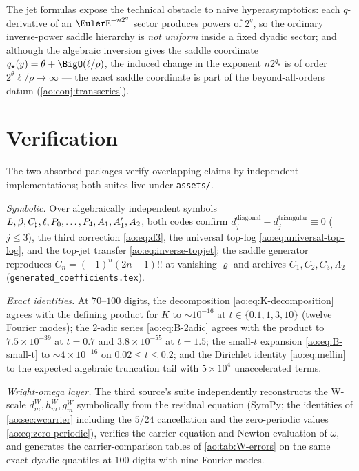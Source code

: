 The jet formulas expose the technical obstacle to naive
hyperasymptotics: each $q$-derivative of an
$\EulerE^{-n2^{q}}$ sector produces powers of $2^{q}$, so the ordinary
inverse-power saddle hierarchy is \emph{not uniform} inside a fixed
dyadic sector; and although the algebraic inversion gives the saddle
coordinate $q_\star(y)=\theta+\BigO(\ell/\rho)$, the induced change
in the exponent $n2^{q_\star}$ is of order
$2^{\theta}\ell/\rho\to\infty$ --- the exact saddle coordinate is
part of the beyond-all-orders datum
(\cref{ao:conj:transseries}).

\section{Verification}
\label{ao:sec:verification-inv}

The two absorbed packages verify overlapping claims by independent
implementations; both suites live under \nolinkurl{assets/}.

\emph{Symbolic.}  Over algebraically independent symbols
$L,\beta,C_{\sharp},\ell,P_0,\dots,P_4,A_1,A_1',A_2$, both codes confirm
$d^{\mathrm{diagonal}}_j-d^{\mathrm{triangular}}_j\equiv0$
($j\le3$), the third correction \eqref{ao:eq:d3}, the universal top-log
\eqref{ao:eq:universal-top-log}, and the top-jet transfer
\eqref{ao:eq:inverse-topjet}; the saddle generator reproduces
$C_n=(-1)^{n}(2n-1)!!$ at vanishing $\varrho$ and archives
$C_1,C_2,C_3,\Lambda_2$ (\nolinkurl{generated_coefficients.tex}).

\emph{Exact identities.}  At $70$--$100$ digits, the decomposition
\eqref{ao:eq:K-decomposition} agrees with the defining product for
$K$ to $\sim10^{-16}$ at $t\in\{0.1,1,3,10\}$ (twelve Fourier
modes); the $2$-adic series \eqref{ao:eq:B-2adic} agrees with the
product to $7.5\times10^{-39}$ at $t=0.7$ and
$3.8\times10^{-55}$ at $t=1.5$; the small-$t$ expansion
\eqref{ao:eq:B-small-t} to $\sim4\times10^{-16}$ on
$0.02\le t\le0.2$; and the Dirichlet identity
\eqref{ao:eq:mellin} to the expected algebraic truncation tail with
$5\times10^{4}$ unaccelerated terms.

\emph{Wright-omega layer.}  The third source's suite independently
reconstructs the W-scale $d_m^W,h_m^W,g_m^W$ symbolically from the residual
equation (SymPy; the identities of
\cref{ao:sec:wcarrier} including the $5/24$ cancellation and the
zero-periodic values \eqref{ao:eq:zero-periodic}), verifies the carrier
equation and Newton evaluation of $\omega$, and generates the
carrier-comparison tables of \cref{ao:tab:W-errors} on the same exact
dyadic quantiles at $100$ digits with nine Fourier modes.

